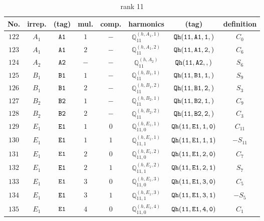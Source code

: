 \documentclass[fleqn,8pt]{jsarticle}
\begin{document}
\begin{table}[ht!]
\begin{center}
\caption{rank 11}
\renewcommand{\arraystretch}{1.3}
\begin{tabular}{cccccccc} \hline \hline
No. & irrep. & (tag) & mul. & comp. & harmonics & (tag) & definition \\ \hline
$ 122 $ & $ A_{1} $ & $ {\tt A1} $ & $ 1 $ & $ - $ & $ \mathbb{Q}_{11}^{(h,A_{1},1)} $ & $ {\tt Qh(11,A1,1,)} $ & $ C_{0} $ \\
$ 123 $ & $ A_{1} $ & $ {\tt A1} $ & $ 2 $ & $ - $ & $ \mathbb{Q}_{11}^{(h,A_{1},2)} $ & $ {\tt Qh(11,A1,2,)} $ & $ C_{6} $ \\
$ 124 $ & $ A_{2} $ & $ {\tt A2} $ & $ - $ & $ - $ & $ \mathbb{Q}_{11}^{(h,A_{2})} $ & $ {\tt Qh(11,A2,,)} $ & $ S_{6} $ \\
$ 125 $ & $ B_{1} $ & $ {\tt B1} $ & $ 1 $ & $ - $ & $ \mathbb{Q}_{11}^{(h,B_{1},1)} $ & $ {\tt Qh(11,B1,1,)} $ & $ S_{9} $ \\
$ 126 $ & $ B_{1} $ & $ {\tt B1} $ & $ 2 $ & $ - $ & $ \mathbb{Q}_{11}^{(h,B_{1},2)} $ & $ {\tt Qh(11,B1,2,)} $ & $ S_{3} $ \\
$ 127 $ & $ B_{2} $ & $ {\tt B2} $ & $ 1 $ & $ - $ & $ \mathbb{Q}_{11}^{(h,B_{2},1)} $ & $ {\tt Qh(11,B2,1,)} $ & $ C_{9} $ \\
$ 128 $ & $ B_{2} $ & $ {\tt B2} $ & $ 2 $ & $ - $ & $ \mathbb{Q}_{11}^{(h,B_{2},2)} $ & $ {\tt Qh(11,B2,2,)} $ & $ C_{3} $ \\
$ 129 $ & $ E_{1} $ & $ {\tt E1} $ & $ 1 $ & $ 0 $ & $ \mathbb{Q}_{11,0}^{(h,E_{1},1)} $ & $ {\tt Qh(11,E1,1,0)} $ & $ C_{11} $ \\
$ 130 $ & $ E_{1} $ & $ {\tt E1} $ & $ 1 $ & $ 1 $ & $ \mathbb{Q}_{11,1}^{(h,E_{1},1)} $ & $ {\tt Qh(11,E1,1,1)} $ & $ - S_{11} $ \\
$ 131 $ & $ E_{1} $ & $ {\tt E1} $ & $ 2 $ & $ 0 $ & $ \mathbb{Q}_{11,0}^{(h,E_{1},2)} $ & $ {\tt Qh(11,E1,2,0)} $ & $ C_{7} $ \\
$ 132 $ & $ E_{1} $ & $ {\tt E1} $ & $ 2 $ & $ 1 $ & $ \mathbb{Q}_{11,1}^{(h,E_{1},2)} $ & $ {\tt Qh(11,E1,2,1)} $ & $ S_{7} $ \\
$ 133 $ & $ E_{1} $ & $ {\tt E1} $ & $ 3 $ & $ 0 $ & $ \mathbb{Q}_{11,0}^{(h,E_{1},3)} $ & $ {\tt Qh(11,E1,3,0)} $ & $ C_{5} $ \\
$ 134 $ & $ E_{1} $ & $ {\tt E1} $ & $ 3 $ & $ 1 $ & $ \mathbb{Q}_{11,1}^{(h,E_{1},3)} $ & $ {\tt Qh(11,E1,3,1)} $ & $ - S_{5} $ \\
$ 135 $ & $ E_{1} $ & $ {\tt E1} $ & $ 4 $ & $ 0 $ & $ \mathbb{Q}_{11,0}^{(h,E_{1},4)} $ & $ {\tt Qh(11,E1,4,0)} $ & $ C_{1} $ \\

\end{tabular}
\end{center}
\end{table}
\end{document}
